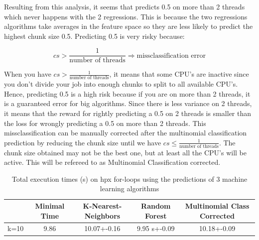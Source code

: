 Resulting from this analysis, it seems that predicts 0.5 on more than 2 threads which never happens with the 2 regressions. This is because the two regressions algorithms take averages in the feature space so they are less likely to predict the highest chunk size 0.5. Predicting 0.5 is very risky because:

$$cs>\frac{1}{\text{number of threads}} \Rightarrow \text{missclassification error}$$

 When you have $cs>\frac{1}{\text{number of threads}}$, it means that some CPU's are inactive since you don't divide your job into enough chunks to split to all available CPU's. Hence, predicting 0.5 is a high risk because if you are on more than 2 threads, it is a guaranteed error for big algorithms. Since there is less variance on 2 threads, it means that the reward for rightly predicting a  0.5 on 2 threads is smaller than the loss for wrongly predicting a 0.5 on more than 2 threads.
This missclassification can be manually corrected after the multinomial classification prediction by reducing the chunk size until we have $cs\leq \frac{1}{\text{number of threads}}$. The chunk size obtained may not be the best one, but at least all the CPU's will be active. This will be refereed to as Multinomial Classification corrected.

\begin{table}[h]
	\centering
	\caption{Total execution times (s) on hpx for-loops using the predictions of 3 machine learning algorithms}
	\label{my-label}
	\begin{tabular}{|c|c|c|c|c|}
		\hline
		& Minimal Time &K-Nearest-Neighbors & Random Forest &Multinomial Class Corrected\\ \hline
		k=10 &9.86 & 10.07+-0.16  & 9.95 s+-0.09 & 10.18+-0.09\\ \hline
	\end{tabular}
\end{table}

